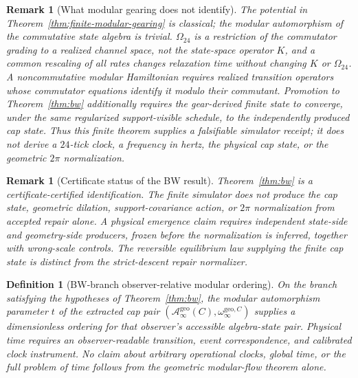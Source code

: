 \documentclass[11pt]{article}
\newtheorem{definition}[theorem]{Definition}
\newtheorem{remark}[theorem]{Remark}
\begin{document}
\begin{remark}[What modular gearing does not identify]
The potential in Theorem~\ref{thm:finite-modular-gearing} is classical; the
modular automorphism of the commutative state algebra is trivial.
\(\Omega_{24}\) is a restriction of the commutator grading to a realized
channel space, not the state-space operator \(K\), and a common rescaling of
all rates changes relaxation time without changing \(K\) or
\(\Omega_{24}\).  A noncommutative modular Hamiltonian requires realized
transition operators whose commutator equations identify it modulo their
commutant.  Promotion to Theorem~\ref{thm:bw} additionally requires the
gear-derived finite state to converge, under the same regularized
support-visible schedule, to the independently produced cap state.  Thus this
finite theorem supplies a falsifiable simulator receipt; it does not derive a
\(24\)-tick clock, a frequency in hertz, the physical cap state, or the
geometric \(2\pi\) normalization.
\end{remark}

\begin{remark}[Certificate status of the BW result]
Theorem~\ref{thm:bw} is a certificate-certified identification. The finite simulator does not
produce the cap state, geometric dilation, support-covariance action, or \(2\pi\) normalization
from accepted repair alone. A physical emergence claim requires independent state-side and
geometry-side producers, frozen before the normalization is inferred, together with wrong-scale
controls. The reversible equilibrium law supplying the finite cap state is distinct from the
strict-descent repair normalizer.
\end{remark}

\begin{definition}[BW-branch observer-relative modular ordering]\label{def:modulartime}
On the branch satisfying the hypotheses of Theorem~\ref{thm:bw}, the modular
automorphism parameter \(t\) of the extracted cap pair
\((\mathcal A_\infty^{\mathrm{geo}}(C),\omega_\infty^{\mathrm{geo},C})\) supplies a
dimensionless ordering for that observer's accessible algebra-state pair. Physical time requires
an observer-readable transition, event correspondence, and calibrated clock instrument. No claim
about arbitrary operational clocks, global time, or the full problem of time follows from the
geometric modular-flow theorem alone.
\end{definition}
\end{document}
